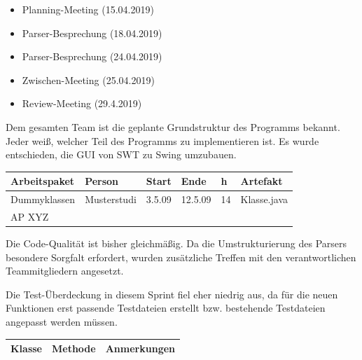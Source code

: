\begin{itemize}
\item Planning-Meeting (15.04.2019)
\item Parser-Besprechung (18.04.2019)
\item Parser-Besprechung (24.04.2019)
\item Zwischen-Meeting (25.04.2019)
\item Review-Meeting (29.4.2019)
\end{itemize}
\nsecend%

Dem gesamten Team ist die geplante Grundstruktur des Programms bekannt. Jeder weiß, welcher Teil des Programms zu implementieren ist. Es wurde entschieden, die GUI von SWT zu Swing umzubauen.
\nsecend

\begin{longtable}{|p{4cm}|l|l|l|l|l|}
        \hline
        Arbeitspaket & Person & Start & Ende & h & Artefakt\\
        \hline
        Dummyklassen & Musterstudi & 3.5.09 & 12.5.09 & 14 & Klasse.java\\ \hline
        AP XYZ &  &  &  & & \\ \hline
\end{longtable}     
\nsecend

Die Code-Qualität ist bisher gleichmäßig. Da die Umstrukturierung des Parsers besondere Sorgfalt erfordert, wurden zusätzliche Treffen mit den verantwortlichen Teammitgliedern angesetzt.
\nsecend%

Die Test-Überdeckung in diesem Sprint fiel eher niedrig aus, da für die neuen Funktionen erst passende Testdateien erstellt bzw. bestehende Testdateien angepasst werden müssen.
\nsecend%

\begin{table}[H]

\begin{tabularx}{\textwidth}{ |l|l|X| }
\hline
\textbf{Klasse} & \textbf{Methode} & \textbf{Anmerkungen}\\
 \hline
\hline
\end{tabularx}
\end{table}

